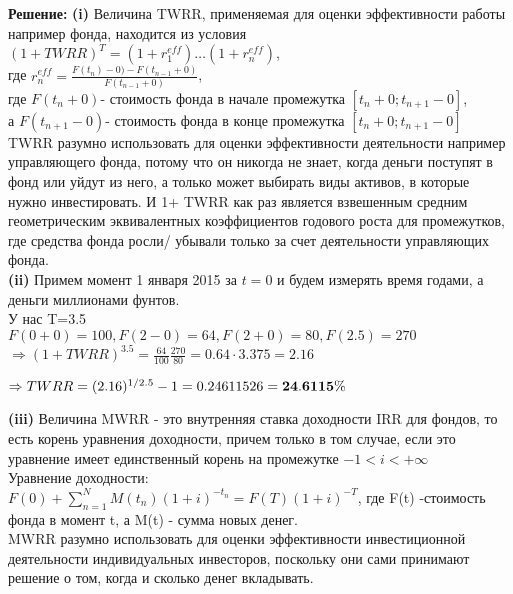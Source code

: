 \documentclass{article}
\begin{document}
{ \bf \large Решение:}
{\bf \large  (i)} Величина TWRR, применяемая для оценки эффективности работы например фонда,  находится из условия\\

$  \boxed { (1+TWRR)^{T} = (1+r_1^{eff}) \dots (1+r_n^{eff}) } $, \\

 где $r_n^{eff} = \frac{ F(t_n)-0) - F(t_{n-1} +0) }{ F(t_{n-1} +0)}$, \\

где $F(t_n+0)$- стоимость фонда в начале промежутка $\left[ t_n+0; t_{n+1}-0\right]$, \\

а $F(t_{n+1}-0)$- стоимость фонда в конце промежутка $\left[ t_n+0; t_{n+1}-0\right]$\\

TWRR разумно использовать для оценки эффективности деятельности например управляющего фонда, 
потому что он никогда не знает, когда деньги поступят в фонд  или уйдут из него, а только может выбирать виды активов, в которые нужно инвестировать. 
И 1+ TWRR как раз  является взвешенным средним геометрическим эквивалентных коэффициентов годового роста для промежутков, где средства фонда росли/ убывали только за счет деятельности управляющих фонда.\\

{\bf \large  (ii)}  Примем момент 1 января 2015 за $t=0$  и будем измерять время годами, а деньги миллионами фунтов. \\
У нас T=3.5 \\
$F(0+0) = 100, F(2-0) = 64, F(2+0) = 80, F(2.5)=270$\\

$\Rightarrow (1+TWRR)^{3.5} = \frac {64}{100} \frac{270}{80} = 0.64 \cdot 3.375 = 2.16$

$\Rightarrow TWRR=  (2.16)^{1/2.5} - 1= 0.24611526 = \bf 24.6115\%$

{\bf \large  (iii)} Величина MWRR  -  это внутренняя ставка доходности IRR для фондов, 
то есть корень уравнения доходности, причем только в том случае, если это уравнение имеет единственный корень на промежутке  $ -1 < i < +\infty$\\

Уравнение доходности:\\
$F(0) + \sum\limits_{n=1}^{N} M(t_n) (1+i)^{-t_n} = F(T)(1+i)^{-T}$, где F(t) -стоимость фонда в момент t, а M(t) - сумма новых денег.\\

MWRR разумно использовать для оценки эффективности  инвестиционной деятельности индивидуальных инвесторов, поскольку они сами принимают решение о том, когда и сколько денег вкладывать.\\
\end{document}
